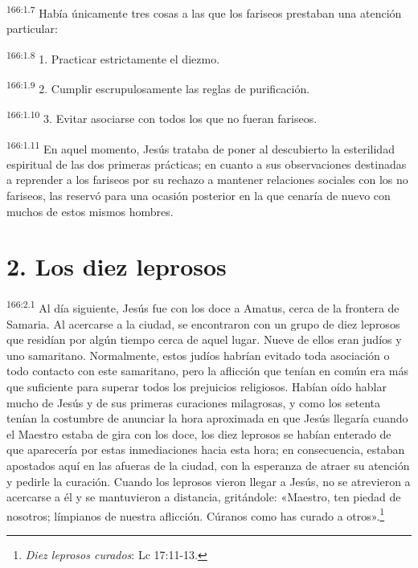 \par
\textsuperscript{166:1.7} Había únicamente tres cosas a las que los fariseos prestaban una atención particular:

\par
\textsuperscript{166:1.8} 1. Practicar estrictamente el diezmo.

\par
\textsuperscript{166:1.9} 2. Cumplir escrupulosamente las reglas de purificación.

\par
\textsuperscript{166:1.10} 3. Evitar asociarse con todos los que no fueran fariseos.

\par
\textsuperscript{166:1.11} En aquel momento, Jesús trataba de poner al descubierto la esterilidad espiritual de las dos primeras prácticas; en cuanto a sus observaciones destinadas a reprender a los fariseos por su rechazo a mantener relaciones sociales con los no fariseos, las reservó para una ocasión posterior en la que cenaría de nuevo con muchos de estos mismos hombres.

\section*{2. Los diez leprosos}
\par
\textsuperscript{166:2.1} Al día siguiente, Jesús fue con los doce a Amatus, cerca de la frontera de Samaria. Al acercarse a la ciudad, se encontraron con un grupo de diez leprosos que residían por algún tiempo cerca de aquel lugar. Nueve de ellos eran judíos y uno samaritano. Normalmente, estos judíos habrían evitado toda asociación o todo contacto con este samaritano, pero la aflicción que tenían en común era más que suficiente para superar todos los prejuicios religiosos. Habían oído hablar mucho de Jesús y de sus primeras curaciones milagrosas, y como los setenta tenían la costumbre de anunciar la hora aproximada en que Jesús llegaría cuando el Maestro estaba de gira con los doce, los diez leprosos se habían enterado de que aparecería por estas inmediaciones hacia esta hora; en consecuencia, estaban apostados aquí en las afueras de la ciudad, con la esperanza de atraer su atención y pedirle la curación. Cuando los leprosos vieron llegar a Jesús, no se atrevieron a acercarse a él y se mantuvieron a distancia, gritándole: «Maestro, ten piedad de nosotros; límpianos de nuestra aflicción. Cúranos como has curado a otros».\footnote{\textit{Diez leprosos curados}: Lc 17:11-13.}

